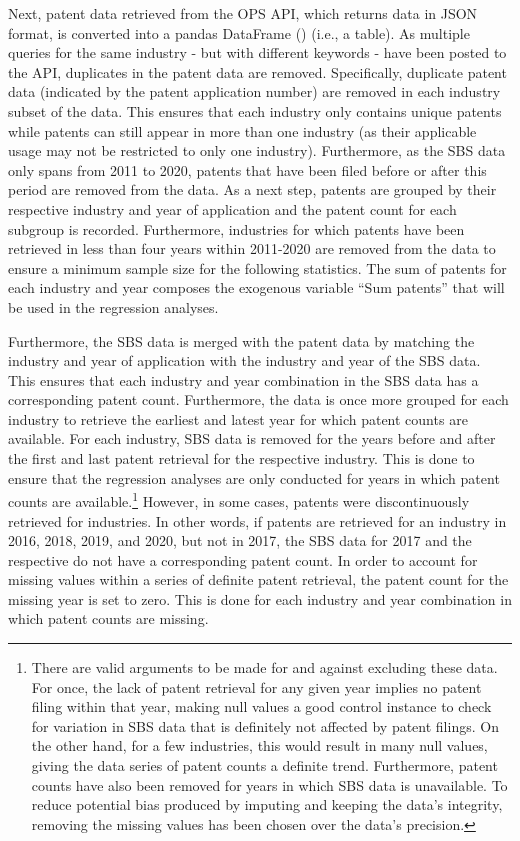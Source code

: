 \documentclass[
  11,
  a4paperpaper,
]{article}
\begin{document}
Next, patent data retrieved from the OPS API, which returns data in JSON
format, is converted into a pandas DataFrame
() (i.e., a table). As multiple queries for
the same industry - but with different keywords - have been posted to
the API, duplicates in the patent data are removed. Specifically,
duplicate patent data (indicated by the patent application number) are
removed in each industry subset of the data. This ensures that each
industry only contains unique patents while patents can still appear in
more than one industry (as their applicable usage may not be restricted
to only one industry). Furthermore, as the SBS data only spans from 2011
to 2020, patents that have been filed before or after this period are
removed from the data. As a next step, patents are grouped by their
respective industry and year of application and the patent count for
each subgroup is recorded. Furthermore, industries for which patents
have been retrieved in less than four years within 2011-2020 are removed
from the data to ensure a minimum sample size for the following
statistics. The sum of patents for each industry and year composes the
exogenous variable ``Sum patents'' that will be used in the regression
analyses.

Furthermore, the SBS data is merged with the patent data by matching the
industry and year of application with the industry and year of the SBS
data. This ensures that each industry and year combination in the SBS
data has a corresponding patent count. Furthermore, the data is once
more grouped for each industry to retrieve the earliest and latest year
for which patent counts are available. For each industry, SBS data is
removed for the years before and after the first and last patent
retrieval for the respective industry. This is done to ensure that the
regression analyses are only conducted for years in which patent counts
are available.\footnote{There are valid arguments to be made for and
  against excluding these data. For once, the lack of patent retrieval
  for any given year implies no patent filing within that year, making
  null values a good control instance to check for variation in SBS data
  that is definitely not affected by patent filings. On the other hand,
  for a few industries, this would result in many null values, giving
  the data series of patent counts a definite trend. Furthermore, patent
  counts have also been removed for years in which SBS data is
  unavailable. To reduce potential bias produced by imputing and keeping
  the data's integrity, removing the missing values has been chosen over
  the data's precision.} However, in some cases, patents were
discontinuously retrieved for industries. In other words, if patents are
retrieved for an industry in 2016, 2018, 2019, and 2020, but not in
2017, the SBS data for 2017 and the respective do not have a
corresponding patent count. In order to account for missing values
within a series of definite patent retrieval, the patent count for the
missing year is set to zero. This is done for each industry and year
combination in which patent counts are
missing.\label{cleaning-missing-values}
\end{document}
